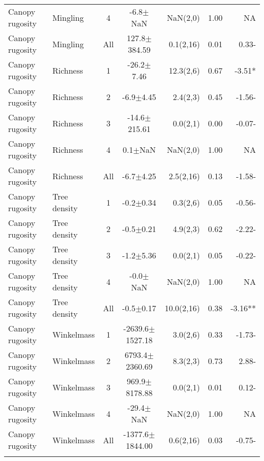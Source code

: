 \begin{longtable}{llcS[table-format=5.1(4.2)]rS[table-format=1.2]r}
  Canopy rugosity & Mingling & 4 & -6.8$\pm$NaN & NaN(2,0) & 1.00 & NA \\ 
  Canopy rugosity & Mingling & All & 127.8$\pm$384.59 & 0.1(2,16) & 0.01 & 0.33- \\ 
   \midrule
Canopy rugosity & Richness & 1 & -26.2$\pm$7.46 & 12.3(2,6) & 0.67 & -3.51* \\ 
  Canopy rugosity & Richness & 2 & -6.9$\pm$4.45 & 2.4(2,3) & 0.45 & -1.56- \\ 
  Canopy rugosity & Richness & 3 & -14.6$\pm$215.61 & 0.0(2,1) & 0.00 & -0.07- \\ 
  Canopy rugosity & Richness & 4 & 0.1$\pm$NaN & NaN(2,0) & 1.00 & NA \\ 
  Canopy rugosity & Richness & All & -6.7$\pm$4.25 & 2.5(2,16) & 0.13 & -1.58- \\ 
   \midrule
Canopy rugosity & Tree density & 1 & -0.2$\pm$0.34 & 0.3(2,6) & 0.05 & -0.56- \\ 
  Canopy rugosity & Tree density & 2 & -0.5$\pm$0.21 & 4.9(2,3) & 0.62 & -2.22- \\ 
  Canopy rugosity & Tree density & 3 & -1.2$\pm$5.36 & 0.0(2,1) & 0.05 & -0.22- \\ 
  Canopy rugosity & Tree density & 4 & -0.0$\pm$NaN & NaN(2,0) & 1.00 & NA \\ 
  Canopy rugosity & Tree density & All & -0.5$\pm$0.17 & 10.0(2,16) & 0.38 & -3.16** \\ 
   \midrule
Canopy rugosity & Winkelmass & 1 & -2639.6$\pm$1527.18 & 3.0(2,6) & 0.33 & -1.73- \\ 
  Canopy rugosity & Winkelmass & 2 & 6793.4$\pm$2360.69 & 8.3(2,3) & 0.73 & 2.88- \\ 
  Canopy rugosity & Winkelmass & 3 & 969.9$\pm$8178.88 & 0.0(2,1) & 0.01 & 0.12- \\ 
  Canopy rugosity & Winkelmass & 4 & -29.4$\pm$NaN & NaN(2,0) & 1.00 & NA \\ 
  Canopy rugosity & Winkelmass & All & -1377.6$\pm$1844.00 & 0.6(2,16) & 0.03 & -0.75- \\ 
  \label{bivar_lm_summ}
\end{longtable}


